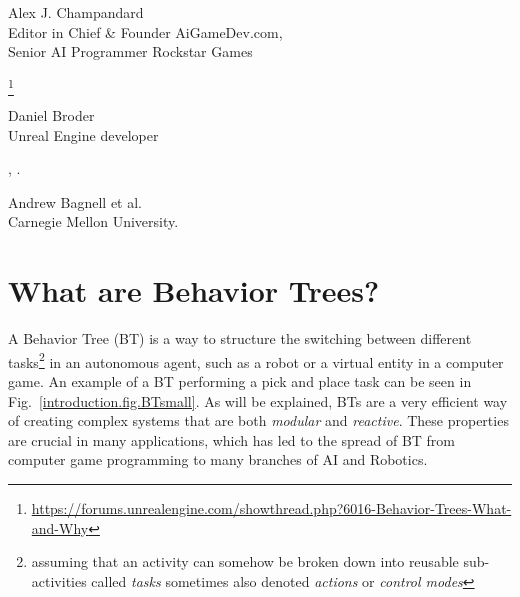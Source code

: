 \begin{flushright}
Alex J. Champandard \\Editor in Chief  \& Founder AiGameDev.com, \\Senior AI Programmer Rockstar Games
\end{flushright}

\footnote{\url{https://forums.unrealengine.com/showthread.php?6016-Behavior-Trees-What-and-Why}}

\begin{flushright}
Daniel Broder \\Unreal Engine developer
\end{flushright}

 , \cite{Bagnell2012b}.
\begin{flushright}
Andrew Bagnell et al. \\ Carnegie Mellon University.
\end{flushright}


\chapter{What are Behavior Trees?}
\label{chap:bts}


A Behavior Tree (BT) is a way to structure the switching between different tasks\footnote{assuming that an activity can somehow be broken down into reusable sub-activities called \emph{tasks} sometimes also denoted \emph{actions} or \emph{control modes}}  in an autonomous agent, such as a robot or a virtual entity 
in a computer game. An example of a BT performing a pick and place task can be seen in Fig.~\ref{introduction.fig.BTsmall}. 
As will be explained, BTs are a very efficient way of creating complex systems that are both \emph{modular} and \emph{reactive}.
These properties are crucial in many applications, which has led to the spread of BT
 from computer game programming to many branches of AI and Robotics.


